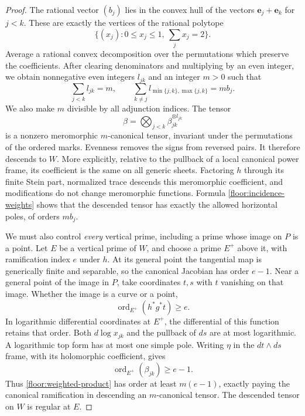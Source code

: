 \documentclass[11pt,letterpaper]{article}
\DeclareMathOperator{\ord}{ord}
\theoremstyle{definition}
\theoremstyle{remark}
\begin{document}
\begin{proof}
The rational vector $(b_j)$ lies in the convex hull of the vectors
$\mathbf e_j+\mathbf e_k$ for $j<k$.  These are exactly the
vertices of the rational polytope
\[
 \bigl\{(x_j):0\le x_j\le1,\ \sum_jx_j=2\bigr\}.
\]
Average a rational convex decomposition over the permutations
which preserve the coefficients.  After clearing denominators
and multiplying by an even integer, we obtain nonnegative even
integers $l_{jk}$ and an integer $m>0$ such that
\begin{equation}
 \label{floor:incidence-weights}
 \sum_{j<k}l_{jk}=m,\qquad
 \sum_{k\ne j}l_{\min\{j,k\},\max\{j,k\}}=mb_j.
\end{equation}
We also make $m$ divisible by all adjunction indices.  The tensor
\begin{equation}
 \label{floor:weighted-product}
 \beta=\bigotimes_{j<k}\beta_{jk}^{\otimes l_{jk}}
\end{equation}
is a nonzero meromorphic $m$-canonical tensor, invariant under
the permutations of the ordered marks.  Evenness removes the
signs from reversed pairs.  It therefore descends to $W$.
More explicitly, relative to the pullback of a local canonical
power frame, its coefficient is the same on all generic sheets.
Factoring $h$ through its finite Stein part, normalized trace
descends this meromorphic coefficient, and modifications do not
change meromorphic functions.  Formula
\eqref{floor:incidence-weights} shows that the descended tensor
has exactly the allowed horizontal poles, of orders $mb_j$.

We must also control \emph{every} vertical prime, including a
prime whose image on $P$ is a point.  Let $E$ be a vertical prime
of $W$, and choose a prime $E^+$ above it, with ramification index
$e$ under $h$.  At its general point the tangential map is
generically finite and separable, so the canonical Jacobian has
order $e-1$.  Near a general point of the image in $P$, take
coordinates $t,s$ with $t$ vanishing on that image.  Whether the
image is a curve or a point,
\[
 \ord_{E^+}(h^*g^*t)\ge e.
\]
In logarithmic differential coordinates at $E^+$, the
differential of this function retains that order.  Both
$d\log x_{jk}$ and the pullback of $ds$ are at most logarithmic.
A logarithmic top form has at most one simple pole.  Writing
$\eta$ in the $dt\wedge ds$ frame, with its holomorphic
coefficient, gives
\begin{equation}
 \label{floor:vertical-order}
 \ord_{E^+}(\beta_{jk})\ge e-1.
\end{equation}
Thus \eqref{floor:weighted-product} has order at least $m(e-1)$,
exactly paying the canonical ramification in descending an
$m$-canonical tensor.  The descended tensor on $W$ is regular at
$E$.


\end{proof}
\end{document}
